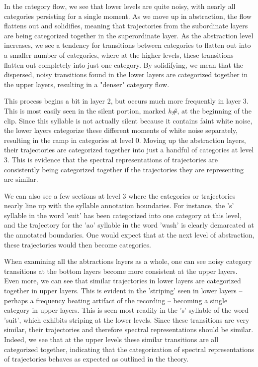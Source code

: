 In the category flow, we see that lower levels are quite noisy, with nearly all categories persisting for a single moment.  As we move up in abstraction, the flow flattens out and solidifies, meaning that trajectories from the subordinate layers are being categorized together in the superordinate layer.  As the abstraction level increases, we see a tendency for transitions between categories to flatten out into a smaller number of categories, where at the higher levels, these transitions flatten out completely into just one category.  By solidifying, we mean that the dispersed, noisy transitions found in the lower layers are categorized together in the upper layers, resulting in a "denser" category flow.

This process begins a bit in layer 2, but occurs much more frequently in layer 3.  This is most easily seen in the silent portion, marked \textit{h\#}, at the beginning of the clip.  Since this syllable is not actually silent because it contains faint white noise, the lower layers categorize these different moments of white noise separately, resulting in the ramp in categories at level 0.  Moving up the abstraction layers, their trajectories are categorized together into just a handful of categories at level 3.  This is evidence that the spectral representations of trajectories are consistently being categorized together if the trajectories they are representing are similar.

We can also see a few sections at level 3 where the categories or trajectories nearly line up with the syllable annotation boundaries.  For instance, the 's' syllable in the word 'suit' has been categorized into one category at this level, and the trajectory for the 'ao' syllable in the word 'wash' is clearly demarcated at the annotated boundaries.  One would expect that at the next level of abstraction, these trajectories would then become categories.

When examining all the abtractions layers as a whole, one can see noisy category transitions at the bottom layers become more consistent at the upper layers.  Even more, we can see that similar trajectories in lower layers are categorized together in upper layers.  This is evident in the 'striping' seen in lower layers -- perhaps a frequency beating artifact of the recording -- becoming a single category in upper layers.  This is seen most readily in the 's' syllable of the word 'suit', which exhibits striping at the lower levels.  Since these transitions are very similar, their trajectories and therefore spectral representations should be similar. Indeed, we see that at the upper levels these similar transitions are all categorized together, indicating that the categorization of spectral representations of trajectories behaves as expected as outlined in the theory.

